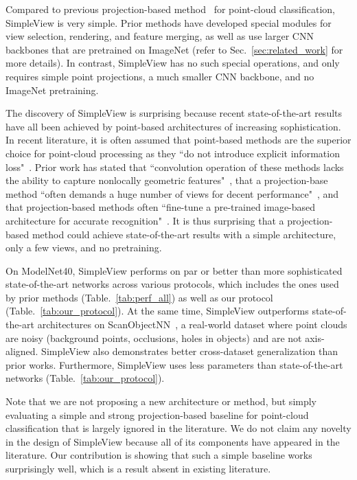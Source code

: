 \documentclass{article}
\newcommand\method{SimpleView}
\begin{document}
Compared to previous projection-based method~\citep{roveri2018network, sarkar2018learning} for point-cloud classification, \method{} is very simple. Prior methods have developed special modules for view selection, rendering, and feature merging, as well as use larger CNN backbones that are pretrained on ImageNet (refer to Sec.~\ref{sec:related_work} for more details). In contrast, \method{} has no such special operations, and only requires simple point projections, a much smaller CNN backbone, and no ImageNet pretraining.

The discovery of \method{} is surprising because recent state-of-the-art results have all been achieved by point-based architectures of increasing sophistication. 
In recent literature, it is often assumed that point-based methods are the superior choice for point-cloud processing as they ``do not introduce explicit information loss"~\citep{guo2020deep}. Prior work has stated that ``convolution operation of these methods lacks the ability to capture nonlocally geometric features"~\citep{yan2020pointasnl}, that a projection-base method ``often demands a huge number of views for decent performance"~\citep{liu2019relation}, and that projection-based methods often ``fine-tune a pre-trained image-based architecture for accurate recognition"~\citep{liu2019relation}. It is thus surprising that a projection-based method could achieve state-of-the-art results with a simple architecture, only a few views, and no pretraining.

On ModelNet40, \method{} performs on par or better than more sophisticated state-of-the-art networks across various protocols, which includes the ones used by prior methods (Table.~\ref{tab:perf_all}) as well as our protocol (Table.~\ref{tab:our_protocol}). At the same time, {\method } outperforms state-of-the-art architectures on ScanObjectNN~\citep{uy2019revisiting}, a real-world dataset where point clouds are noisy (background points, occlusions, holes in objects) and are not axis-aligned. \method{} also demonstrates better cross-dataset generalization than prior works. Furthermore, \method{} uses less parameters than state-of-the-art networks (Table.~\ref{tab:our_protocol}).

Note that we are not proposing a new architecture or method, but simply evaluating a simple and strong projection-based baseline for point-cloud classification that is largely ignored in the literature.  We do not claim any novelty in the design of \method{} because all of its components have appeared in the literature. Our contribution is showing that such a simple baseline works surprisingly well, which is a result absent in existing literature. 
\end{document}
